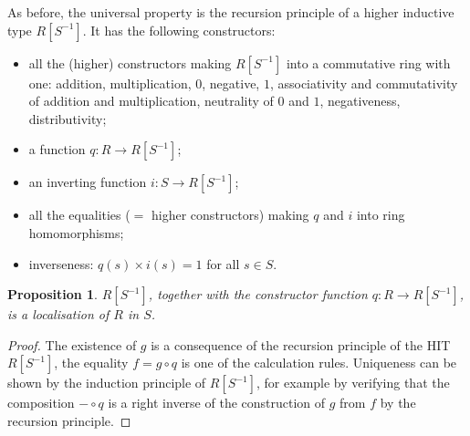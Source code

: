 \documentclass{amsart}
\theoremstyle{plain}
\numberwithin{equation}{section} %
\numberwithin{figure}{section} %
\theoremstyle{plain}
\theoremstyle{plain}
\theoremstyle{plain}
\theoremstyle{plain}
\theoremstyle{plain}
\newtheorem{prop}[thm]{Proposition} %
\theoremstyle{plain}
\theoremstyle{remark}
\theoremstyle{remark}
\theoremstyle{remark}
\begin{document}
As before, the universal property is the recursion principle of a higher inductive type $R[S^{-1}]$. It has the following constructors:
\begin{itemize}
\item all the (higher) constructors making $R[S^{-1}]$ into a commutative ring with one: addition, multiplication, $0$, negative, $1$, associativity and commutativity of addition and multiplication, neutrality of $0$ and $1$, negativeness, distributivity;
\item a function $q : R \rightarrow R[S^{-1}]$;
\item an inverting function $i : S \rightarrow R[S^{-1}]$;
\item all the equalities ($=$ higher constructors) making $q$ and $i$ into ring homomorphisms;
\item inverseness: $q(s) \times i(s) = 1$ for all $s \in S$.
\end{itemize} 

\begin{prop}
$R[S^{-1}]$, together with the constructor function $q : R \rightarrow R[S^{-1}]$, is a localisation of $R$ in $S$.
\end{prop}
\begin{proof}
The existence of $g$ is a consequence of the recursion principle of the HIT $R[S^{-1}]$, the equality $f = g \circ q$ is one of the calculation rules. Uniqueness can be shown by the induction principle of $R[S^{-1}]$, for example by verifying that the composition $- \circ q$ is a right inverse of the construction of $g$ from $f$ by the recursion principle. 
\end{proof}
\end{document}
